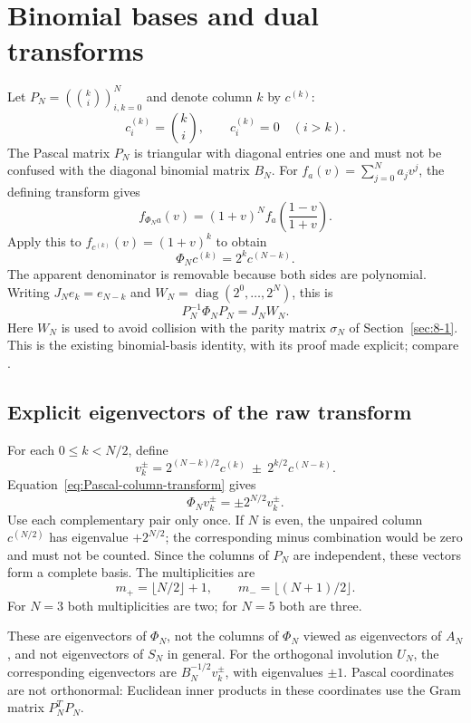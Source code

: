 \section{Binomial bases and dual transforms}
\label{sec:14-5}
Let $P_N=(\binom{k}{i})_{i,k=0}^N$ and denote column $k$ by $c^{(k)}$:
\[
c^{(k)}_i=\binom{k}{i},\qquad c^{(k)}_i=0\quad(i>k).
\]
The Pascal matrix $P_N$ is triangular with diagonal entries one and
must not be confused with the diagonal binomial matrix $B_N$.
For $f_a(v)=\sum_{j=0}^N a_jv^j$, the defining transform gives
\[
f_{\Phi_Na}(v)=(1+v)^N f_a\!\left(\frac{1-v}{1+v}\right).
\]
Apply this to $f_{c^{(k)}}(v)=(1+v)^k$ to obtain
\begin{equation}\label{eq:Pascal-column-transform}
\Phi_Nc^{(k)}=2^k c^{(N-k)}.
\end{equation}
The apparent denominator is removable because both sides are polynomial.
Writing $J_Ne_k=e_{N-k}$ and
$W_N=\operatorname{diag}(2^0,\ldots,2^N)$, this is
\[
P_N^{-1}\Phi_NP_N=J_NW_N.
\]
Here $W_N$ is used to avoid collision with the parity matrix $\sigma_N$
of Section~\ref{sec:8-1}. This is the existing binomial-basis identity,
with its proof made explicit; compare \cite[Section~7.3]{KocikFeynman}.

\subsection{Explicit eigenvectors of the raw transform}
For each $0\leq k<N/2$, define
\[
v_k^{\pm}=2^{(N-k)/2}c^{(k)}\ \pm\ 2^{k/2}c^{(N-k)}.
\]
Equation~\eqref{eq:Pascal-column-transform} gives
\[
\Phi_Nv_k^{\pm}=\pm 2^{N/2}v_k^{\pm}.
\]
Use each complementary pair only once. If $N$ is even, the unpaired
column $c^{(N/2)}$ has eigenvalue $+2^{N/2}$; the corresponding minus
combination would be zero and must not be counted.
Since the columns of $P_N$ are independent, these vectors form a complete
basis. The multiplicities are
\[
m_+=\lfloor N/2\rfloor+1,\qquad
m_-=\lfloor (N+1)/2\rfloor.
\]
For $N=3$ both multiplicities are two; for $N=5$ both are three.

These are eigenvectors of $\Phi_N$, not the columns of $\Phi_N$ viewed
as eigenvectors of $A_N$, and not eigenvectors of $S_N$ in general.
For the orthogonal involution $U_N$, the corresponding eigenvectors are
$B_N^{-1/2}v_k^{\pm}$, with eigenvalues $\pm1$.
Pascal coordinates are not orthonormal: Euclidean inner products in
these coordinates use the Gram matrix $P_N^TP_N$.



